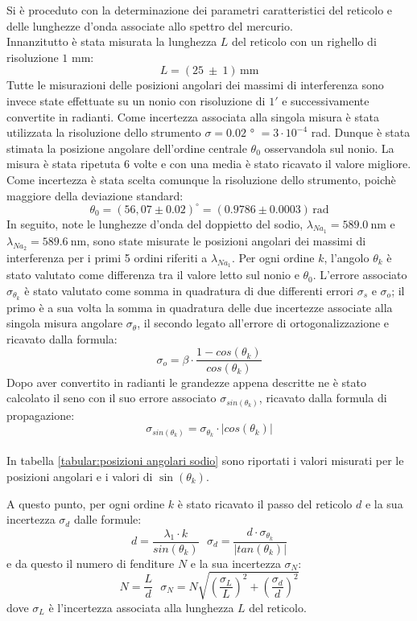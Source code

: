\documentclass{article}
\begin{document}
        Si è proceduto con la determinazione dei parametri caratteristici del reticolo e delle lunghezze d'onda associate allo spettro del mercurio. \\
        Innanzitutto è stata misurata la lunghezza $L$ del reticolo con un righello di risoluzione $1$ mm: \[L = (25\ \pm \ 1)\, \mathrm{mm}\]
        Tutte le misurazioni delle posizioni angolari dei massimi di interferenza sono invece state effettuate su un nonio con risoluzione di $1'$ e 
        successivamente  convertite in radianti. Come incertezza associata alla singola misura è stata utilizzata la risoluzione dello strumento
        $\sigma = 0.02$ ° $ = 3\cdot10^{-4}$ rad.
        Dunque è stata stimata la posizione angolare dell'ordine centrale $\theta_0$ osservandola sul nonio. La misura è stata ripetuta 6 volte 
        e con una media è stato ricavato il valore migliore. Come incertezza è stata scelta comunque la risoluzione dello strumento, 
        poichè maggiore della deviazione standard: \[\theta_0 = (56,07 \pm 0.02) ^{\circ} = (0.9786	\pm 0.0003 )\, \mathrm{rad}\]
        In seguito, note le lunghezze d'onda del doppietto del sodio, $\lambda_{{Na}_1} = 589.0\ \mathrm{nm}$ e $\lambda_{{Na}_2} = 589.6\ \mathrm{nm}$,
        sono state misurate le posizioni angolari dei massimi di interferenza per i primi 5 ordini riferiti a $\lambda_{{Na}_1}$. 
        Per ogni ordine $k$, l'angolo $\theta_k$ è stato valutato come differenza tra il valore letto sul nonio e $\theta_0$. 
        L'errore associato $\sigma_{\theta_k}$ è stato valutato come somma in quadratura di due differenti errori $\sigma_s$ e $\sigma_o$; 
        il primo è a sua volta la somma in quadratura delle due incertezze associate alla singola misura angolare $\sigma_{\theta}$, 
        il secondo legato all'errore di ortogonalizzazione e ricavato dalla formula: \[\sigma_o = \beta \cdot \frac{1-cos(\theta_k)}{cos(\theta_k)}\]
        Dopo aver convertito in radianti le grandezze appena descritte ne è stato calcolato il seno con il suo errore associato $\sigma_{sin(\theta_k)}$,
        ricavato dalla formula di propagazione: \[\sigma_{sin(\theta_k)} = \sigma_{\theta_k} \cdot |cos(\theta_k)|\] \\
        In tabella \ref{tabular:posizioni angolari sodio} sono riportati i valori misurati per le posizioni angolari e i valori di $\sin(\theta_k)$.

        A questo punto, per ogni ordine $k$ è stato ricavato il passo del reticolo $d$ e la sua incertezza $\sigma_d$ dalle formule: 
        \[d = \frac{\lambda_1 \cdot k}{sin(\theta_k)} \ \ \ \sigma_d = \frac{d \cdot \sigma_{\theta_k}}{|tan(\theta_k)|}\]
        e da questo il numero di fenditure $N$ e la sua incertezza $\sigma_N$: 
        \[N = \frac{L}{d} \ \ \ \sigma_N = N \sqrt{(\frac{\sigma_L}{L})^2 + (\frac{\sigma_d}{d})^2}\]
        dove $\sigma_L$ è l'incertezza associata alla lunghezza $L$ del reticolo. \\
        
\end{document}
